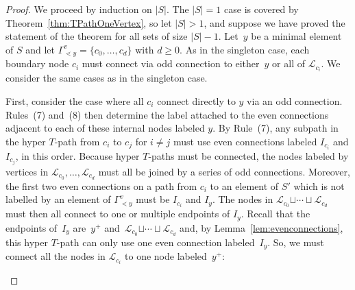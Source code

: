 \documentclass[pdftex]{sigma}
\numberwithin{equation}{section}
\newcommand{\new}[1]{{#1}}
\begin{document}
\begin{proof}
We proceed by induction on $\vert S \vert$. The $\vert S \vert = 1$ case is covered by Theorem~\ref{thm:TPathOneVertex}, so let $\vert S \vert > 1$, and suppose we have proved the statement of the theorem for all sets of size $\vert S \vert-1$. Let~$y$ be a minimal element of $S$ and let $\Gamma_{\lessdot y}^v = \{c_0,\ldots,c_d\}$ with $d \geq 0$. As in the singleton case, each boundary node $c_i$ must connect via odd connection to either~$y$ or all of $\mathcal{L}_{c_i}$. We consider the same cases as in the singleton case.

First, consider the case where all $c_i$ connect directly to $y$ via an odd connection. Rules~(7) and~(8) then determine the label attached to the even connections adjacent to each of these internal nodes labeled $y$. By Rule~(7), any subpath in the hyper $T$-path from $c_i$ to $c_j$ for $i \neq j$ must use even connections labeled $I_{c_i}$ and $I_{c_j}$, in this order. Because hyper $T$-paths must be connected, the nodes labeled by vertices in $\mathcal{L}_{c_0}, \dots, \mathcal{L}_{c_d}$ must all be joined by a series of odd connections. Moreover, the first two even connections on a path from $c_i$ to an element of $S'$ which is not labelled by an element of $\Gamma_{\lessdot y}^v$ must be $I_{c_i}$ and $I_y$. The nodes in $\mathcal{L}_{c_0} \new{\sqcup \cdots \sqcup} \mathcal{L}_{c_d}$ must then all connect to one or multiple endpoints of $I_y$. Recall that the endpoints of~$I_y$ are~$y^+$ and~$\mathcal{L}_{c_0} \new{\sqcup \cdots \sqcup} \mathcal{L}_{c_d}$ and, by Lemma~\ref{lem:evenconnections}, this hyper $T$-path can only use one even connection labeled~$I_y$. So, we must connect all the nodes in $\mathcal{L}_{c_i}$ to one node labeled~$y^+$:
\begin{center}
\end{center}
\end{proof}
\end{document}
